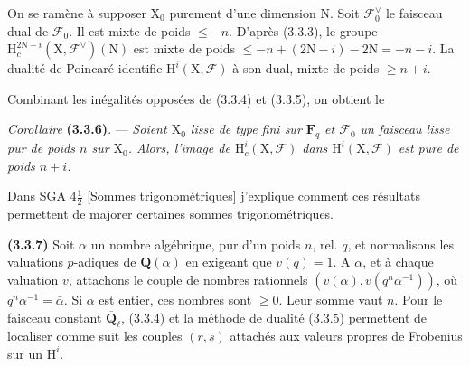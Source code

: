 \documentclass[11pt,leqno]{article}
\begin{document}
On se ramène à supposer \(\mathrm{X}_0\) purement d’une dimension \(\mathrm{N}\). Soit \(\mathscr{F}_0^\vee\) le faisceau dual de \(\mathscr{F}_0\). Il est mixte de poids \(\leq-n\). D’après (3.3.3), le groupe \(\mathrm{H}_c^{2\mathrm{N}-i}(\mathrm{X},\mathscr{F}^\vee)(\mathrm{N})\) est mixte de poids \(\leq-n+(2\mathrm{N}-i)-2\mathrm{N}=-n-i\). La dualité de Poincaré identifie \(\mathrm{H}^i(\mathrm{X},\mathscr{F})\) à son dual, mixte de poids \(\geq n+i\).

Combinant les inégalités opposées de (3.3.4) et (3.3.5), on obtient le

\textit{Corollaire} \textbf{(3.3.6)}. — \textit{Soient \(\mathrm{X}_0\) lisse de type fini sur \(\mathbf{F}_q\) et \(\mathscr{F}_0\) un faisceau lisse pur de poids \(n\) sur \(\mathrm{X}_0\). Alors, l’image de \(\mathrm{H}_c^i(\mathrm{X},\mathscr{F})\) dans \(\mathrm{H}^i(\mathrm{X},\mathscr{F})\) est pure de poids \(n+i\).}

Dans SGA \(4\frac{1}{2}\) [Sommes trigonométriques] j’explique comment ces résultats permettent de majorer certaines sommes trigonométriques.

\textbf{(3.3.7)} Soit \(\alpha\) un nombre algébrique, pur d’un poids \(n\), rel. \(q\), et normalisons les valuations \(p\)-adiques de \(\mathbf{Q}(\alpha)\) en exigeant que \(v(q)=1\). A \(\alpha\), et à chaque valuation \(v\), attachons le couple de nombres rationnels \((v(\alpha),v(q^n\alpha^{-1}))\), où \(q^n\alpha^{-1}=\bar{\alpha}\). Si \(\alpha\) est entier, ces nombres sont \(\geq0\). Leur somme vaut \(n\). Pour le faisceau constant \(\overline{\mathbf{Q}}_\ell\), (3.3.4) et la méthode de dualité (3.3.5) permettent de localiser comme suit les couples \((r,s)\) attachés aux valeurs propres de Frobenius sur un \(\mathrm{H}^i\).
\end{document}
